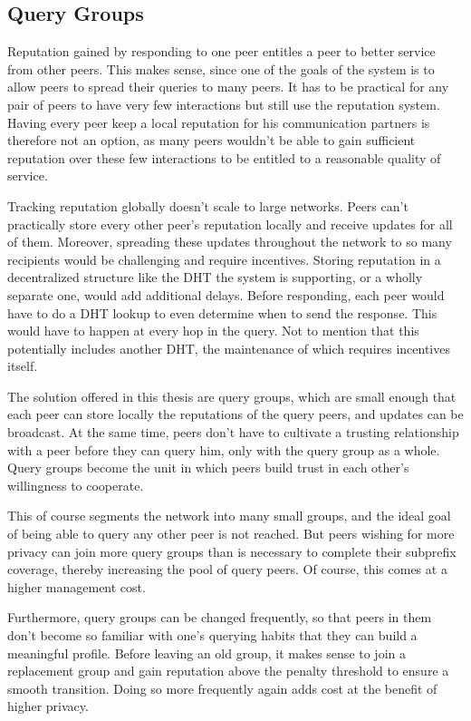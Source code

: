 \subsection{Query Groups}
Reputation gained by responding to one peer entitles a peer to better service
from other peers. This makes sense, since one of the goals of the system is to
allow peers to spread their queries to many peers. It has to be practical for
any pair of peers to have very few interactions but still use the reputation
system. Having every peer keep a local reputation for his communication partners
is therefore not an option, as many peers wouldn't be able to gain sufficient
reputation over these few interactions to be entitled to a reasonable quality of
service.

Tracking reputation globally doesn't scale to large networks. Peers can't
practically store every other peer's reputation locally and receive updates for
all of them. Moreover, spreading these updates throughout the network to so many
recipients would be challenging and require incentives. Storing reputation in a
decentralized structure like the DHT the system is supporting, or a wholly
separate one, would add additional delays. Before responding, each peer would
have to do a DHT lookup to even determine when to send the response. This would
have to happen at every hop in the query. Not to mention that this potentially
includes another DHT, the maintenance of which requires incentives itself.

The solution offered in this thesis are query groups, which are small enough
that each peer can store locally the reputations of the query peers, and updates
can be broadcast. At the same time, peers don't have to cultivate a trusting
relationship with a peer before they can query him, only with the query group as
a whole. Query groups become the unit in which peers build trust in each other's
willingness to cooperate.

This of course segments the network into many small groups, and the ideal goal
of being able to query any other peer is not reached. But peers wishing for more
privacy can join more query groups than is necessary to complete their subprefix
coverage, thereby increasing the pool of query peers. Of course, this comes at a
higher management cost.

Furthermore, query groups can be changed frequently, so that peers in them don't
become so familiar with one's querying habits that they can build a meaningful
profile. Before leaving an old group, it makes sense to join a replacement group
and gain reputation above the penalty threshold to ensure a smooth transition.
Doing so more frequently again adds cost at the benefit of higher privacy.

